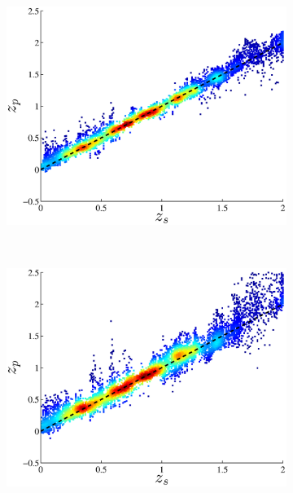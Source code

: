 \documentclass[useAMS,usenatbib,fleqn]{mn2e}
\begin{document}
\begin{figure}
\begin{subfigure}[b]{0.24\textwidth}
        \end{subfigure}
        ~
        \begin{subfigure}[b]{0.24\textwidth}
                \includegraphics[width=\textwidth]{figures/23_J.eps}
        \end{subfigure}
         ~
        \begin{subfigure}[b]{0.24\textwidth}
                \includegraphics[width=\textwidth]{figures/ANN_23.eps}
        \end{subfigure}
        

\end{figure}
\end{document}
